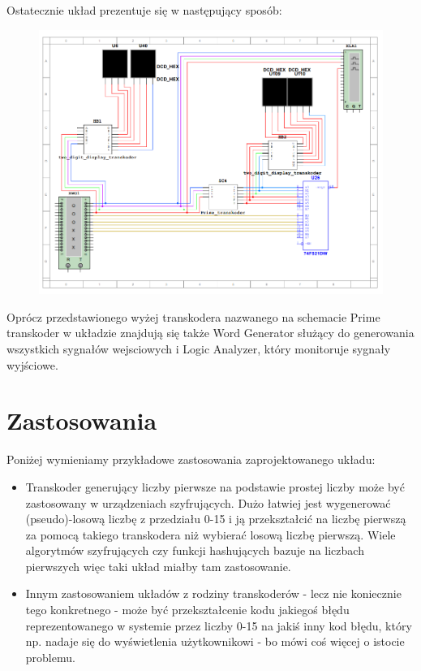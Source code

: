 \documentclass[a4paper]{article}
\begin{document}
Ostatecznie układ prezentuje się w następujący sposób:
\begin{figure}[H]
  \centering
  \includegraphics{schemat.png}
 \end{figure}

 Oprócz przedstawionego wyżej transkodera nazwanego na schemacie Prime transkoder w układzie znajdują się
  także Word Generator służący do generowania wszystkich sygnałów wejsciowych i Logic Analyzer, który monitoruje sygnały wyjściowe.




\section{Zastosowania}
Poniżej wymieniamy przykładowe zastosowania zaprojektowanego układu:
\begin{itemize}
  \item Transkoder generujący liczby pierwsze na podstawie prostej liczby może być zastosowany w urządzeniach 
      szyfrujących. Dużo łatwiej jest wygenerować (pseudo)-losową liczbę z przedziału 0-15 i ją przekształcić na
      liczbę pierwszą za pomocą takiego transkodera niż wybierać losową liczbę pierwszą. Wiele algorytmów szyfrujących
      czy funkcji hashujących bazuje na liczbach pierwszych więc taki układ miałby tam zastosowanie.
  \item Innym zastosowaniem układów z rodziny transkoderów - lecz nie koniecznie tego konkretnego - może być 
      przekształcenie kodu jakiegoś błędu reprezentowanego w systemie przez liczby 0-15 na jakiś inny kod błędu, 
      który np. nadaje się do wyświetlenia użytkownikowi - bo mówi coś więcej o istocie problemu.
\end{itemize}
\end{document}
